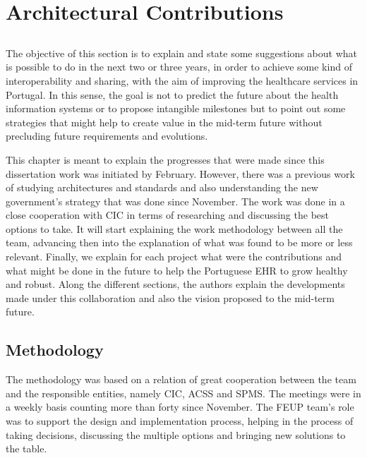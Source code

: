 \chapter{Architectural Contributions} \label{chap:arch-proposal}

\section*{}

The objective of this section is to explain and state some suggestions about what is possible to do in the next two or three years, in order to achieve some kind of interoperability and sharing, with the aim of improving the healthcare services in Portugal. In this sense, the goal is not to predict the future about the health information systems or to propose intangible milestones but to point out some strategies that might help to create value in the mid-term future without precluding future requirements and evolutions.

This chapter is meant to explain the progresses that were made since this dissertation work was initiated by February. However, there was a previous work of studying architectures and standards and also understanding the new government's strategy that was done since November. The work was done in a close cooperation with CIC in terms of researching and discussing the best options to take. It will start explaining the work methodology between all the team, advancing then into the explanation of what was found to be more or less relevant. Finally, we explain for each project what were the contributions and what might be done in the future to help the Portuguese EHR to grow healthy and robust. Along the different sections, the authors explain the developments made under this collaboration and also the vision proposed to the mid-term future.

\section{Methodology}

The methodology was based on a relation of great cooperation between the team and the responsible entities, namely CIC, ACSS and SPMS. The meetings were in a weekly basis counting more than forty since November. The FEUP team's role was to support the design and implementation process, helping in the process of taking decisions, discussing the multiple options and bringing new solutions to the table.

